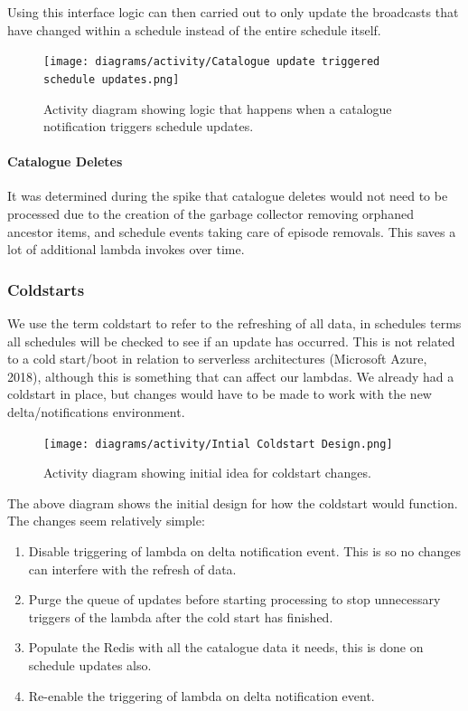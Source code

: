   Using this interface logic can then carried out to only update the broadcasts that have changed within a schedule instead of the 
  entire schedule itself.

  \begin{figure}[H]
    \centering
    \texttt{[image: diagrams/activity/Catalogue update triggered schedule updates.png]}
    \caption{Activity diagram showing logic that happens when a catalogue notification triggers schedule updates.}
    \label{fig:catalogueTriggeredScheduleUpdateActivity}
  \end{figure}

  \paragraph{Catalogue Deletes}
  It was determined during the spike that catalogue deletes would not need to be processed due to the creation of the garbage collector removing 
  orphaned ancestor items, and schedule events taking care of episode removals. This saves a lot of additional lambda invokes over time.

  \newpage
  \subsubsection{Coldstarts}
  We use the term coldstart to refer to the refreshing of all data, in schedules terms all schedules will be checked to see if an update has occurred.
  This is not related to a cold start/boot in relation to serverless architectures (Microsoft Azure, 2018), although this is something that can affect 
  our lambdas. We already had a coldstart in place, but changes would have to be made to work with the new delta/notifications environment.

  \begin{figure}[H]
    \centering
    \texttt{[image: diagrams/activity/Intial Coldstart Design.png]}
    \caption{Activity diagram showing initial idea for coldstart changes.}
    \label{fig:initialColdstart}
  \end{figure}

  The above diagram shows the initial design for how the coldstart would function. The changes seem relatively simple:
  \begin{enumerate}
    \item Disable triggering of lambda on delta notification event. This is so no changes can interfere with the refresh of data.
    \item Purge the queue of updates before starting processing to stop unnecessary triggers of the lambda after the cold start has finished.
    \item Populate the Redis with all the catalogue data it needs, this is done on schedule updates also. 
    \item Re-enable the triggering of lambda on delta notification event.
  \end{enumerate}

